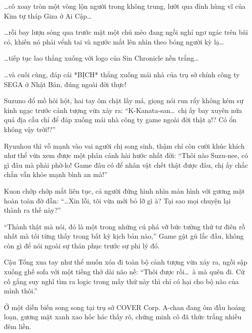 \documentclass[../main.tex]{subfiles}
\begin{document}

\dots cô xoay tròn một vòng lộn người trong không trung, lướt qua đỉnh hùng vĩ của Kim tự tháp Giza ở Ai Cập\dots


\dots rồi bay lượn sóng qua trước mặt một chú mèo đang ngồi nghỉ ngơ ngác trên bãi cỏ, khiến nó phải vểnh tai và ngước mắt lên nhìn theo bóng người kỳ lạ\dots


\dots tiếp tục lao thẳng xuống với logo của Sin Chronicle nền trắng\dots


\dots và cuối cùng, đáp cái *BỊCH* thẳng xuống mái nhà của trụ sở chính công ty SEGA ở Nhật Bản, đúng ngoài đời thực!


Suzuno đổ mồ hôi hột, hai tay ôm chặt lấy má, giọng nói run rẩy không kém sự kinh ngạc trước cảnh tượng vừa xảy ra: ``K-Kanata-san\dots\ chị ấy bay xuyên nửa quả địa cầu chỉ để đáp xuống mái nhà công ty game ngoài đời thật ạ!? Có ổn không vậy trời!?''

Ryuuhou thì vỗ mạnh vào vai người chị song sinh, thậm chí còn cười khúc khích như thể vừa xem được một phân cảnh hài hước nhất đời: ``Thôi nào Suzu-nee, có gì đâu mà phải phờ-lo! Game đâu có để nhân vật chết thật được đâu, chị ấy chắc chắn vẫn khỏe mạnh bình an mà!''

Kuon chớp chớp mắt liên tục, cả người đứng hình nhìn màn hình với gương mặt hoàn toàn đờ đẫn: ``\dots Xin lỗi, tôi vừa mới bỏ lỡ gì à? Tại sao mọi chuyện lại thành ra thế này?''

``Thành thật mà nói, đó là một trong những cú phá vỡ bức tường thứ tư điên rồ nhất mà tôi từng thấy trong bất kỳ kịch bản nào,'' Game gật gù lắc đầu, không còn gì để nói ngoài sự thán phục trước sự phi lý đó.

Cậu Tổng xua tay như thể muốn xóa đi toàn bộ cảnh tượng vừa xảy ra, ngồi sập xuống ghế sofa với một tiếng thở dài não nề: ``Thôi được rồi\dots\ à mà quên đi. Cứ cố gắng suy nghĩ tìm ra logic trong mấy thứ này thì chỉ có hại cho bộ não của mình thôi.''

\ct

Ở một diễn biến song song tại trụ sở COVER Corp. A-chan đang ôm đầu hoảng loạn, gương mặt xanh xao hốc hác thấy rõ, chứng minh cô đã thức trắng nhiều đêm liền.

\end{document}
